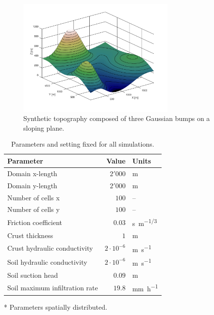 \begin{figure}[htpb]
  \centering
  \includegraphics[width=0.7\textwidth]{Figures/topography.png}
  \caption{Synthetic topography composed of three Gaussian bumps on a sloping plane.}
  \label{fig:topography}
\end{figure}

\begin{table}[htpb]
  \centering
  \caption{Parameters and setting fixed for all simulations.}
  \label{tab:simulations_parameters}
  \begin{threeparttable}
    \begin{tabular}{lrl}
      \toprule
      \textbf{Parameter} & \textbf{Value} & \textbf{Units} \\
      \midrule
      Domain x-length                          &    $2'000$           & \si{\meter}   \\
      Domain y-length                          &    $2'000$           & \si{\meter}   \\
      Number of cells x                        &    $100$             & --   \\
      Number of cells y                        &    $100$             & --   \\
      Friction coefficient\tnote{*}            &    $0.03$            & \si{s.m^{-1/3}}\\
      Crust thickness\tnote{*}                 &    $1$               & \si{\meter}\\
      Crust hydraulic conductivity\tnote{*}    &    $2\cdot 10^{-6}$  & \si{\meter\per\second}\\
      Soil hydraulic conductivity\tnote{*}     &    $2\cdot 10^{-6}$  & \si{\meter\per\second}\\
      Soil suction head\tnote{*}               &    $0.09$      & \si{\meter}\\
      Soil maximum infiltration rate\tnote{*}  &    $19.8$      & \si{\milli\meter\per\hour}\\
      \bottomrule
    \end{tabular}
    \begin{tablenotes}
      \item[*] Parameters spatially distributed.
    \end{tablenotes}
  \end{threeparttable}
\end{table}


